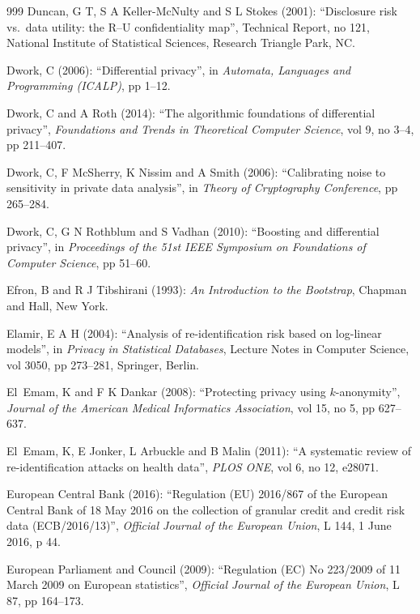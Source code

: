 \begin{thebibliography}{999}
Duncan, G T, S A Keller-McNulty and S L Stokes (2001): ``Disclosure risk vs.\ data utility: the R--U confidentiality map'', Technical Report, no 121, National Institute of Statistical Sciences, Research Triangle Park, NC.

Dwork, C (2006): ``Differential privacy'', in \emph{Automata, Languages and Programming (ICALP)}, pp 1--12.

Dwork, C and A Roth (2014): ``The algorithmic foundations of differential privacy'', \emph{Foundations and Trends in Theoretical Computer Science}, vol 9, no 3--4, pp 211--407.

Dwork, C, F McSherry, K Nissim and A Smith (2006): ``Calibrating noise to sensitivity in private data analysis'', in \emph{Theory of Cryptography Conference}, pp 265--284.

Dwork, C, G N Rothblum and S Vadhan (2010): ``Boosting and differential privacy'', in \emph{Proceedings of the 51st IEEE Symposium on Foundations of Computer Science}, pp 51--60.

Efron, B and R J Tibshirani (1993): \emph{An Introduction to the Bootstrap}, Chapman and Hall, New York.

Elamir, E A H (2004): ``Analysis of re-identification risk based on log-linear models'', in \emph{Privacy in Statistical Databases}, Lecture Notes in Computer Science, vol 3050, pp 273--281, Springer, Berlin.

El~Emam, K and F K Dankar (2008): ``Protecting privacy using $k$-anonymity'', \emph{Journal of the American Medical Informatics Association}, vol 15, no 5, pp 627--637.

El~Emam, K, E Jonker, L Arbuckle and B Malin (2011): ``A systematic review of re-identification attacks on health data'', \emph{PLOS ONE}, vol 6, no 12, e28071.

European Central Bank (2016): ``Regulation (EU) 2016/867 of the European Central Bank of 18 May 2016 on the collection of granular credit and credit risk data (ECB/2016/13)'', \emph{Official Journal of the European Union}, L 144, 1 June 2016, p 44.

European Parliament and Council (2009): ``Regulation (EC) No 223/2009 of 11 March 2009 on European statistics'', \emph{Official Journal of the European Union}, L 87, pp 164--173.


\end{thebibliography}
